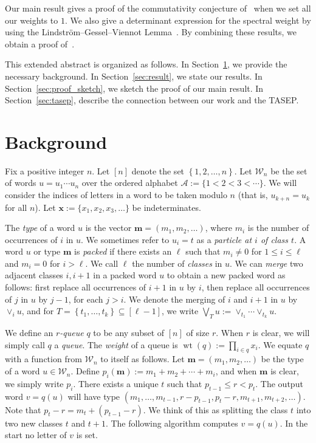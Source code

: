 \documentclass[submission]{FPSAC2018}
\newcommand{\merge}[2]{\vee_{#1}#2} %
\DeclareMathOperator{\wt}{wt} %
\newcommand{\xx}{\mathbf{x}}
\newcommand{\mm}{\mathbf{m}}
\newcommand{\mcA}{\mathcal{A}}
\newcommand{\mcW}{\mathcal{W}}
\newcommand{\set}[1]{\left\{ #1 \right\}}
\newcommand{\ive}[1]{\left[ #1 \right]}
\newcommand{\defn}[1]{{\color{darkred}\emph{#1}}} %
\theoremstyle{plain}
\theoremstyle{definition}
\numberwithin{equation}{section}
\begin{document}
Our main result gives a proof of the commutativity conjecture of~\cite{AAMP} when we set all our weights to $1$.
We also give a determinant expression for the spectral weight by using the Lindstr\"om--Gessel--Viennot Lemma~\cite{GV85,Lindstrom73}.
By combining these results, we obtain a proof of~\cite[Conj.~3.10]{AasLin17}.

This extended abstract is organized as follows.
In Section~\ref{sec:background}, we provide the necessary background.
In Section~\ref{sec:result}, we state our results.
In Section~\ref{sec:proof_sketch}, we sketch the proof of our main result.
In Section~\ref{sec:tasep}, describe the connection between our work and the TASEP.









\section{Background}
\label{sec:background}

Fix a positive integer $n$. Let $\ive{n}$ denote the set $\set{1, 2, \dotsc, n}$.
Let $\mcW_n$ be the set of words $u = u_1 \dotsm u_n$ over the ordered alphabet $\mcA := \{1 < 2 < 3 < \cdots \}$.
We will consider the indices of letters in a word to be taken modulo $n$ (that is, $u_{k+n} = u_k$ for all $n$).
Let $\xx := \{x_1, x_2, x_3, \ldots\}$ be indeterminates.

The \defn{type} of a word $u$ is the vector $\mm = (m_1, m_2, \ldots)$, where $m_i$ is the number of occurrences of $i$ in $u$.
We sometimes refer to $u_i = t$ as a \defn{particle at $i$ of class $t$}.
A word $u$ or type $\mm$ is \defn{packed} if there exists an $\ell$ such that $m_i \neq 0$ for $1 \leq i \leq \ell$ and $m_i = 0$ for $i > \ell$.
We call $\ell$ the number of \defn{classes} in $u$.
We can \defn{merge} two adjacent classes $i,i+1$ in a packed word $u$ to obtain a new packed word as follows: first replace all occurrences of $i+1$ in $u$ by $i$, then replace all occurrences of $j$ in $u$ by $j-1$, for each $j > i$.
We denote the merging of $i$ and $i+1$ in $u$ by $\merge{i}{u}$, and for $T = \set{t_1, \dotsc, t_k} \subseteq \ive{\ell-1}$, we write $\bigvee_T u := \merge{t_1}{\cdots\merge{t_k}{u}}$.

We define an \defn{$r$-queue} $q$ to be any subset of $\ive{n}$ of size $r$. When $r$ is clear, we will simply call $q$ a \defn{queue}.
The \defn{weight} of a queue is $\wt(q) := \prod_{i \in q} x_i$.
We equate $q$ with a function from $\mcW_n$ to itself as follows.
Let $\mm = (m_1, m_2, \ldots)$ be the type of a word $u \in \mcW_n$.
Define $p_i(\mm) := m_1 + m_2 + \cdots + m_i$, and when $\mm$ is clear, we simply write $p_i$.
There exists a unique $t$ such that
$
p_{t-1} \leq r < p_t.
$
The output word $v = q(u)$ will have type $(m_1, \dots, m_{t-1}, r-p_{t-1}, p_{t}-r, m_{t+1}, m_{t+2}, \ldots)$.
Note that $p_{t} - r = m_{t} + (p_{t-1} - r)$.
We think of this as splitting the class $t$ into two new classes $t$ and $t+1$. The following algorithm computes $v = q(u)$. In the start no letter of $v$ is set.
\end{document}
